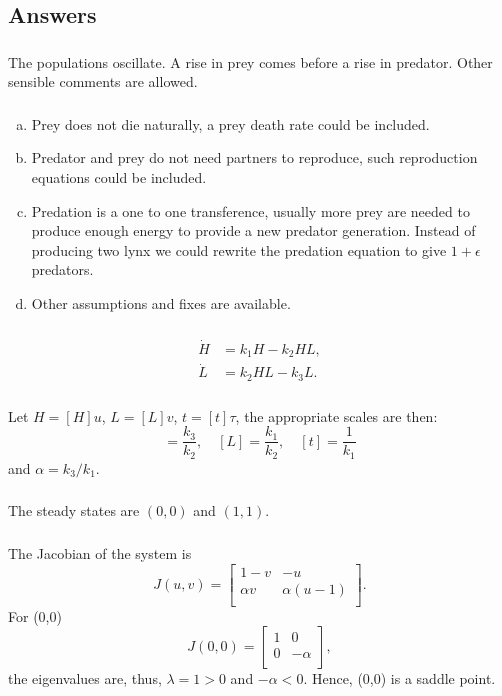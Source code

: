 \documentclass[]{article}
\newcommand{\bb}{\begin{equation}}
\newcommand{\ee}{\end{equation}}
\begin{document}
\begin{Answ}
\subsection{Answers}
\subsubsection{}
The populations oscillate. A rise in prey comes before a rise in predator. Other sensible comments are allowed.
\subsubsection{}
\begin{enumerate}[(a)]
\item Prey does not die naturally, a prey death rate could be included.
\item Predator and prey do not need partners to reproduce, such reproduction equations could be included.
\item Predation is a one to one transference, usually more prey are needed to produce enough energy to provide a new predator generation. Instead of producing two lynx we could rewrite the predation equation to give $1+\epsilon$ predators.
\item Other assumptions and fixes are available.
\end{enumerate}
\subsubsection{}
\begin{align}
\dot{H}&=k_1H-k_2HL,\\
\dot{L}&=k_2HL-k_3L.
\end{align}
\subsubsection{}
Let $H=[H]u$, $L=[L]v$, $t=[t]\tau$, the appropriate scales are then:
\bb
[H]=\frac{k_3}{k_2},\quad [L]=\frac{k_1}{k_2},\quad [t]=\frac{1}{k_1}
\ee
and $\alpha=k_3/k_1$.
\subsubsection{}
The steady states are $(0,0)$ and $(1,1)$.
\subsubsection{}
The Jacobian of the system is
\bb
J(u,v)=\left[ {\begin{array}{cc}
   1-v & -u \\
   \alpha v & \alpha(u-1) \\
  \end{array} } \right].
\ee
For (0,0)
\bb
J(0,0)=\left[ {\begin{array}{cc}
   1 & 0 \\
   0 & -\alpha \\
  \end{array} } \right],
\ee
the eigenvalues are, thus, $\lambda=1>0$ and $-\alpha<0$. Hence, (0,0) is a saddle point.


\end{Answ}
\end{document}
